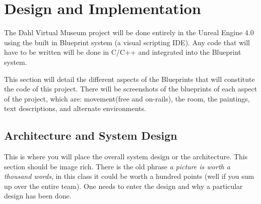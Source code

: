 

\chapter{Design  and Implementation}
The Dahl Virtual Museum project will be done entirely in the Unreal Engine 4.0 using the built in Blueprint system (a visual scripting IDE).  Any code that will have to be written will be done in C/C++ and integrated into the Blueprint system.  

This section will detail the different aspects of the Blueprints that will constitute the code of this project.  There will be screenshots of the blueprints of each aspect of the project, which are: movement(free and on-rails), the room, the paintings, text descriptions, and alternate environments. 
 


 
 \section{Architecture and System Design}
 This is where you will place the overall system design or the architecture.   This section should be image rich.  There is the old phrase {\it a picture is worth a thousand words}, in this class it could be worth a hundred points (well if you sum up over the entire team).   One needs to enter the design and why a particular design has been done.   
 
